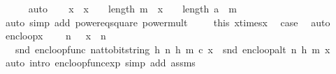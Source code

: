 \begin{isabellebody}
\ \ \ \ \isamarkupfalse%
\ auto\isanewline
\isanewline
\ \ \isamarkupfalse%
\ {\isachardoublequoteopen}{\isacharparenleft}{\kern0pt}x\ {\isacharasterisk}{\kern0pt}\ x{\isacharparenright}{\kern0pt}\ {\isacharcircum}{\kern0pt}\ {\isacharparenleft}{\kern0pt}{}\ {\isacharcircum}{\kern0pt}\ length\ m{\isacharparenright}{\kern0pt}\ {\isacharequal}{\kern0pt}\ x\ {\isacharcircum}{\kern0pt}\ {\isacharparenleft}{\kern0pt}{}\ {\isacharcircum}{\kern0pt}\ length\ {\isacharparenleft}{\kern0pt}a\ {\isacharhash}{\kern0pt}\ m{\isacharparenright}{\kern0pt}{\isacharparenright}{\kern0pt}{\isachardoublequoteclose}\isanewline
\ \ \ \ \isamarkupfalse%
\ {\isacharparenleft}{\kern0pt}auto\ simp\ add{\isacharcolon}{\kern0pt}\ power{}{\isacharunderscore}{\kern0pt}eq{\isacharunderscore}{\kern0pt}square\ power{\isacharunderscore}{\kern0pt}mult{\isacharparenright}{\kern0pt}\ \isanewline
\ \ \isamarkupfalse%
\ this\ x{\isacharunderscore}{\kern0pt}times{\isacharunderscore}{\kern0pt}x\ \isamarkupfalse%
\ {\isacharquery}{\kern0pt}case\ \isamarkupfalse%
\ auto\isanewline
{}\isamarkupfalse%
%
\endisatagproof
{\isafoldproof}%
%
\isadelimproof
\isanewline
%
\endisadelimproof
\isanewline
{}\isamarkupfalse%
\ enc{\isacharunderscore}{\kern0pt}loop{\isacharunderscore}{\kern0pt}x{\isacharcolon}{\kern0pt}\ \isanewline
\ \ \ {\isachardoublequoteopen}n\ {\isachargreater}{\kern0pt}\ {}{\isachardoublequoteclose}\ {\isachardoublequoteopen}x\ {\isacharless}{\kern0pt}\ n{\isachardoublequoteclose}\isanewline
\ \ \ {\isachardoublequoteopen}snd\ {\isacharparenleft}{\kern0pt}enc{\isacharunderscore}{\kern0pt}loop{\isacharunderscore}{\kern0pt}func\ {\isacharparenleft}{\kern0pt}nat{\isacharunderscore}{\kern0pt}to{\isacharunderscore}{\kern0pt}bitstring\ h{\isacharcomma}{\kern0pt}\ n{\isacharcomma}{\kern0pt}\ h{\isacharcomma}{\kern0pt}\ m{\isacharparenright}{\kern0pt}\ c\ x{\isacharparenright}{\kern0pt}\ {\isacharequal}{\kern0pt}\ snd\ {\isacharparenleft}{\kern0pt}enc{\isacharunderscore}{\kern0pt}loop{\isacharunderscore}{\kern0pt}alt\ {\isacharparenleft}{\kern0pt}n{\isacharcomma}{\kern0pt}\ h{\isacharcomma}{\kern0pt}\ m{\isacharparenright}{\kern0pt}\ x{\isacharparenright}{\kern0pt}{\isachardoublequoteclose}\isanewline
%
\isadelimproof
\ \ %
\endisadelimproof
%
\isatagproof
{}\isamarkupfalse%
\ {\isacharparenleft}{\kern0pt}auto\ intro{\isacharcolon}{\kern0pt}\ enc{\isacharunderscore}{\kern0pt}loop{\isacharunderscore}{\kern0pt}func{\isacharunderscore}{\kern0pt}exp\ simp\ add{\isacharcolon}{\kern0pt}\ assms{\isacharparenright}{\kern0pt}%

\end{isabellebody}
